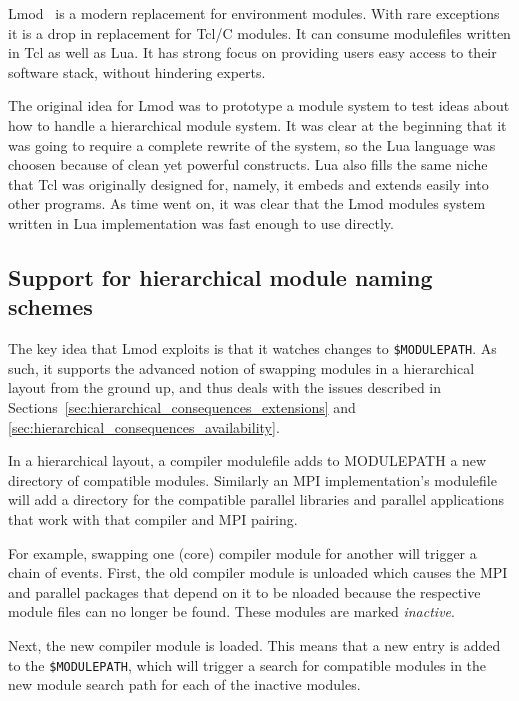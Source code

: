 Lmod~\cite{laytonLmod,taccSecretSauce,taccLmod} is a modern
replacement for environment modules.  With rare exceptions it is a
drop in replacement for Tcl/C modules. It can consume modulefiles
written in Tcl as well as Lua\cite{LuaBook}.  It has strong focus on
providing users easy access to their software stack, without hindering
experts.

The original idea for Lmod was to prototype a module system to test
ideas about how to handle a hierarchical module system.  It was clear
at the beginning that it was going to require a complete rewrite of
the system, so the Lua language was choosen because of clean yet
powerful constructs.  Lua also fills the same niche that Tcl was
originally designed for, namely, it embeds and extends easily into
other programs.  As time went on, it was clear that the Lmod modules
system written in Lua implementation was fast enough to use directly.

\subsection{Support for hierarchical module naming schemes}

The key idea that Lmod exploits is that it watches changes to
\texttt{\$MODULEPATH}. As such, it supports the advanced notion of
swapping modules in a hierarchical layout from the ground up, and thus
deals with the issues described in
Sections~\ref{sec:hierarchical_consequences_extensions} and
\ref{sec:hierarchical_consequences_availability}.

In a hierarchical layout, a compiler modulefile adds to
MODULEPATH a new directory of compatible modules.  Similarly an MPI
implementation's modulefile will add a directory for the compatible
parallel libraries and parallel applications that work with that
compiler and MPI pairing.

For example, swapping one (core) compiler module for another will trigger
a chain of events.  First, the old compiler module is unloaded
which causes the MPI and parallel packages that depend on it to be
nloaded because the respective module files can no longer be found.
These modules are marked \emph{inactive}.

Next, the new compiler module is loaded.  This means that a new entry
is added to the \texttt{\$MODULEPATH}, which will trigger a search
for compatible modules in the new module search path for each of the
inactive modules.

